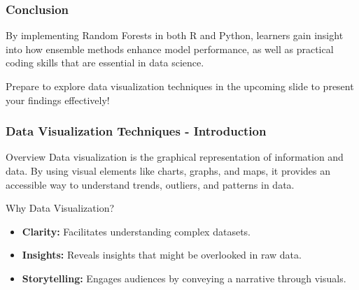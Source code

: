 \documentclass[aspectratio=169]{beamer}
\begin{document}
\begin{frame}[fragile]
    \frametitle{Conclusion}
    By implementing Random Forests in both R and Python, learners gain insight into how ensemble methods enhance model performance,
    as well as practical coding skills that are essential in data science.
    
    Prepare to explore data visualization techniques in the upcoming slide to present your findings effectively!
\end{frame}

\begin{frame}[fragile]
    \frametitle{Data Visualization Techniques - Introduction}
    \begin{block}{Overview}
        Data visualization is the graphical representation of information and data. 
        By using visual elements like charts, graphs, and maps, it provides an accessible way to understand trends, outliers, and patterns in data.
    \end{block}
    
    \begin{block}{Why Data Visualization?}
        \begin{itemize}
            \item \textbf{Clarity:} Facilitates understanding complex datasets.
            \item \textbf{Insights:} Reveals insights that might be overlooked in raw data.
            \item \textbf{Storytelling:} Engages audiences by conveying a narrative through visuals.
        \end{itemize}
    \end{block}
\end{frame}
\end{document}
